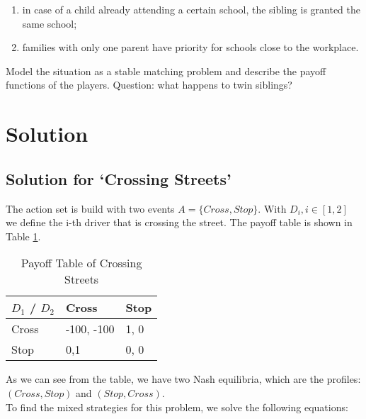\documentclass{article}
\begin{document}
\begin{enumerate}
    \item in case of a child already attending a certain school, the sibling is granted the same school; 
    \item families with only one parent have priority for schools close to the workplace.
\end{enumerate}

Model the situation as a stable matching problem and describe the payoff functions of the players. Question: what happens to twin siblings?  

\section{Solution}

\subsection{Solution for `Crossing Streets'}

The action set is build with two events $A= \{\textit{Cross}, \textit{Stop}\}$. With $D_i, i \in [1, 2]$ we define the i-th driver that is crossing the street.
The payoff table is shown in Table \ref{tbl:payoff1}.

\begin{table}[!h]
    \label{tbl:payoff1}
    \begin{center}
        \begin{tabular}{l|l|l|}
            \cline{2-3}
            $D_1$ / $D_2$                  & Cross      & Stop \\ \hline
            \multicolumn{1}{|l|}{Cross} & -100, -100 & 1, 0 \\ \hline
            \multicolumn{1}{|l|}{Stop}  & 0,1        & 0, 0 \\ \hline
            \end{tabular}
    \end{center}
    \caption{Payoff Table of Crossing Streets}
\end{table}

\noindent As we can see from the table, we have two Nash equilibria, which are the profiles: $(\textit{Cross}, \textit{Stop})$ and $(\textit{Stop}, \textit{Cross})$.\\

\noindent To find the mixed strategies for this problem, we solve the following equations:
\end{document}
